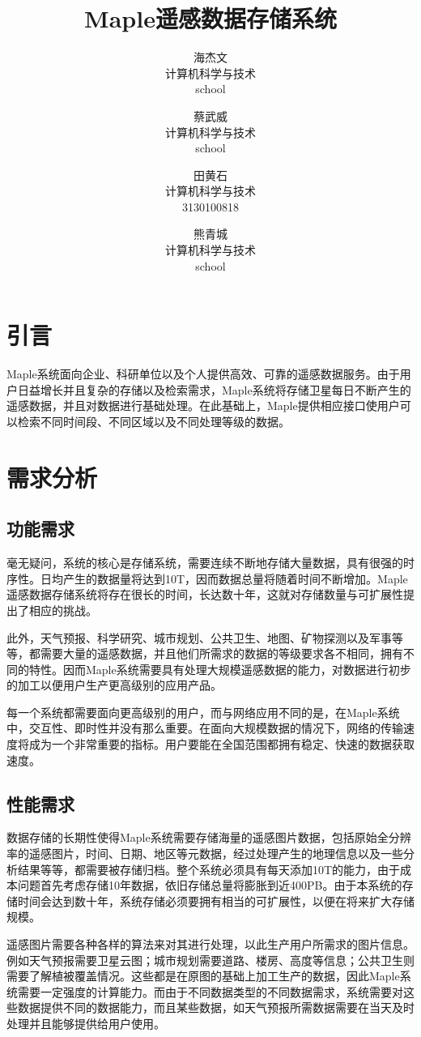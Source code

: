 \documentclass{article}
\title{Maple遥感数据存储系统}
\author{
    海杰文\\
    计算机科学与技术\\
    school
  	\and
    蔡武威\\
    计算机科学与技术\\
    school
    \and
    田黄石\\
    计算机科学与技术\\
    3130100818
    \and
    熊青城\\
    计算机科学与技术\\
    school
}
\date{}
\begin{document}
\maketitle

\section{引言}
Maple系统面向企业、科研单位以及个人提供高效、可靠的遥感数据服务。由于用户日益增长并且复杂的存储以及检索需求，Maple系统将存储卫星每日不断产生的遥感数据，并且对数据进行基础处理。在此基础上，Maple提供相应接口使用户可以检索不同时间段、不同区域以及不同处理等级的数据。

\section{需求分析}
\subsection{功能需求}
毫无疑问，系统的核心是存储系统，需要连续不断地存储大量数据，具有很强的时序性。日均产生的数据量将达到10T，因而数据总量将随着时间不断增加。Maple遥感数据存储系统将存在很长的时间，长达数十年，这就对存储数量与可扩展性提出了相应的挑战。

此外，天气预报、科学研究、城市规划、公共卫生、地图、矿物探测以及军事等等，都需要大量的遥感数据，并且他们所需求的数据的等级要求各不相同，拥有不同的特性。因而Maple系统需要具有处理大规模遥感数据的能力，对数据进行初步的加工以便用户生产更高级别的应用产品。

每一个系统都需要面向更高级别的用户，而与网络应用不同的是，在Maple系统中，交互性、即时性并没有那么重要。在面向大规模数据的情况下，网络的传输速度将成为一个非常重要的指标。用户要能在全国范围都拥有稳定、快速的数据获取速度。

\subsection{性能需求}
数据存储的长期性使得Maple系统需要存储海量的遥感图片数据，包括原始全分辨率的遥感图片，时间、日期、地区等元数据，经过处理产生的地理信息以及一些分析结果等等，都需要被存储归档。整个系统必须具有每天添加10T的能力，由于成本问题首先考虑存储10年数据，依旧存储总量将膨胀到近400PB。由于本系统的存储时间会达到数十年，系统存储必须要拥有相当的可扩展性，以便在将来扩大存储规模。

遥感图片需要各种各样的算法来对其进行处理，以此生产用户所需求的图片信息。例如天气预报需要卫星云图；城市规划需要道路、楼房、高度等信息；公共卫生则需要了解植被覆盖情况。这些都是在原图的基础上加工生产的数据，因此Maple系统需要一定强度的计算能力。而由于不同数据类型的不同数据需求，系统需要对这些数据提供不同的数据能力，而且某些数据，如天气预报所需数据需要在当天及时处理并且能够提供给用户使用。
\end{document}
